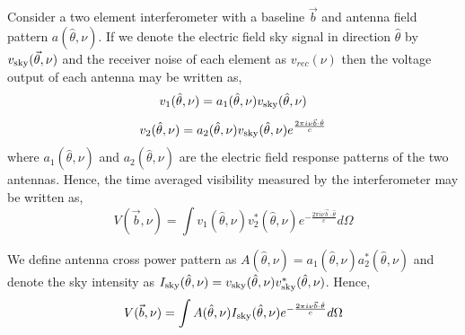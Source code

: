 \documentclass[twocolumn]{emulateapj}
\newcommand{\volt}{{v}}
\newcommand{\vis}{{V}}
\newcommand{\sky}{{\rm sky}}
\newcommand{\bmvolt}{{a}}
\newcommand{\beam}{{A}}
\newcommand{\thhat}{{\hat\theta}}
\newcommand{\fngexp}{{e^{\frac{2\pi i\nu\vec{b}\cdot\thhat}{c}}}}
\newcommand{\ifngexp}{{e^{-\frac{2\pi i\nu\vec{b}\cdot\thhat}{c}}}}
\begin{document}
Consider a two element interferometer with a baseline $\vec b$ and antenna field pattern $\bmvolt(\thhat, \nu)$. If we denote the electric field sky signal in direction $\thhat$ by $\volt_\sky(\vec \theta, \nu)$ and the receiver noise of each element as $\volt_{rec}(\nu)$ then the voltage output of each antenna may be written as,  
\begin{equation}
\volt_{1}(\thhat, \nu) = \bmvolt_{1}(\thhat,\nu)\volt_\sky(\thhat,\nu)\nonumber\\
\end{equation}
\begin{equation}
\volt_{2} (\thhat, \nu)= \bmvolt_{2}(\thhat,\nu)\volt_\sky(\thhat,\nu)\fngexp\nonumber\\
\end{equation}
where $\bmvolt_{1}(\thhat,\nu)$ and $\bmvolt_{2}(\thhat,\nu)$ are the electric field response patterns 
of the two antennas.
Hence, the time averaged visibility measured by the interferometer may be written as, 
\begin{equation}
\vis(\vec b, \nu) =  \int  \volt_{1}(\thhat,\nu)  \volt_{2}^{*} (\thhat, \nu) \ifngexp d\Omega 
\label{eq1}
\end{equation}

We define antenna cross power pattern as  $\beam(\thhat,\nu)=\bmvolt_{1}(\thhat,\nu)\bmvolt_{2}^{*}(\thhat,\nu)$ and denote the sky intensity as  $I_\sky(\thhat,\nu)=\volt_\sky(\thhat,\nu)\volt_\sky^{*}(\thhat,\nu)$. Hence, 
\begin{equation}
\vis(\vec b,\nu) = \int \beam(\thhat, \nu) I_\sky(\thhat,\nu) \ifngexp d\Omega
\label{eq2}
\end{equation}
\end{document}
